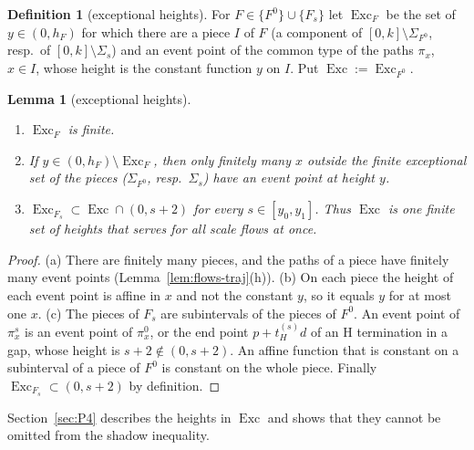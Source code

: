\documentclass[11pt]{amsart}
\newcommand{\Exc}{\operatorname{Exc}}
\newcommand{\Fz}{F^{0}}
\newcommand{\Fs}{F_{s}}
\newtheorem{lemma}[theorem]{Lemma}
\theoremstyle{definition}
\newtheorem{definition}[theorem]{Definition}
\theoremstyle{remark}
\numberwithin{equation}{section}
\begin{document}
\begin{definition}[exceptional heights]\label{def:flows-exc}
For $F\in\{\Fz\}\cup\{\Fs\}$ let $\Exc_F$ be the set of $y\in(0,h_F)$ for which there are a piece $I$ of $F$ (a component
of $[0,k]\setminus\Sigma_{\Fz}$, resp.\ of $[0,k]\setminus\Sigma_s$) and an event point of the common type of the paths
$\pi_x$, $x\in I$, whose height is the constant function $y$ on $I$. Put $\Exc:=\Exc_{\Fz}$.
\end{definition}

\begin{lemma}[exceptional heights]\label{lem:flows-exc}
\begin{enumerate}[label=(\alph*)]
\item $\Exc_F$ is finite.
\item If $y\in(0,h_F)\setminus\Exc_F$, then only finitely many $x$ outside the finite exceptional set of the pieces
($\Sigma_{\Fz}$, resp.\ $\Sigma_s$) have an event point at height $y$.
\item $\Exc_{\Fs}\subset\Exc\cap(0,s+2)$ for every $s\in[y_0,y_1]$. Thus $\Exc$ is one finite set of heights that serves for
all scale flows at once.
\end{enumerate}
\end{lemma}

\begin{proof}
(a) There are finitely many pieces, and the paths of a piece have finitely many event points
(Lemma~\ref{lem:flows-traj}(h)). (b) On each piece the height of each event point is affine in $x$ and not the constant
$y$, so it equals $y$ for at most one $x$. (c) The pieces of $\Fs$ are subintervals of the pieces of $\Fz$. An event
point of $\pi^s_x$ is an event point of $\pi^0_x$, or the end point $p+t^{(s)}_Hd$ of an H termination in a gap, whose
height is $s+2\notin(0,s+2)$. An affine function that is constant on a subinterval of a piece of $\Fz$ is constant on the
whole piece. Finally $\Exc_{\Fs}\subset(0,s+2)$ by definition.
\end{proof}

Section~\ref{sec:P4} describes the heights in $\Exc$ and shows that they cannot be omitted from the shadow inequality.
\end{document}
